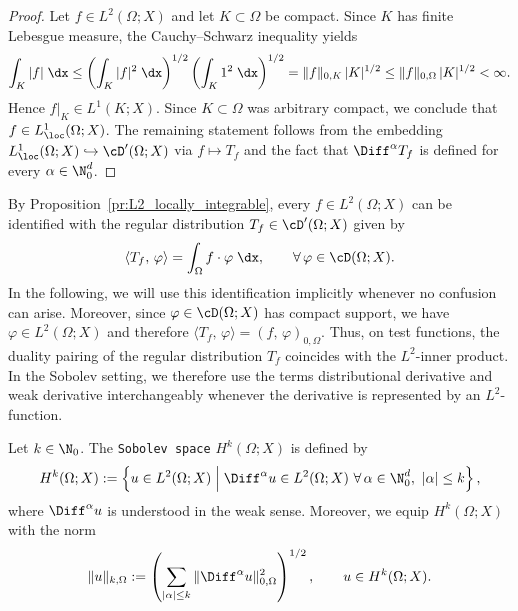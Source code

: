 \begin{proof}
	Let $f\in L^2(\Omega;X)$ and let $K\subset\Omega$ be compact. Since $K$ has finite Lebesgue measure, the Cauchy--Schwarz inequality yields
	\begin{equation*}
		\int_K |f|\;\dx
		\le
		\left(\int_K |f|^2\;\dx\right)^{1/2}\left(\int_K 1^2\;\dx\right)^{1/2}
		=
		\|f\|_{0,K}\,|K|^{1/2}
		\le
		\|f\|_{0,\Omega}\,|K|^{1/2}
		<\infty.
	\end{equation*}
	Hence $f|_K\in L^1(K;X)$. Since $K\subset\Omega$ was arbitrary compact, we conclude that $f\in L^1_\loc(\Omega;X)$. The remaining statement follows from the embedding $L^1_\loc(\Omega;X)\hookrightarrow\cD^\prime(\Omega;X)$ via $f\mapsto T_f$ and the fact that $\Diff^\alpha T_f$ is defined for every $\alpha\in\N_0^d$.
\end{proof}

By Proposition~\ref{pr:L2_locally_integrable}, every $f\in L^2(\Omega;X)$ can be identified with the regular distribution $T_f\in\cD^\prime(\Omega;X)$ given by
\begin{equation*}
	\langle T_f,\,\varphi\rangle = \int_\Omega f\cdot\varphi\;\dx,
	\qquad \forall\,\varphi\in\cD(\Omega;X).
\end{equation*}
In the following, we will use this identification implicitly whenever no confusion can arise. Moreover, since $\varphi\in\cD(\Omega;X)$ has compact support, we have $\varphi\in L^2(\Omega;X)$ and therefore $\langle T_f,\,\varphi\rangle = (f,\,\varphi)_{0,\Omega}$. Thus, on test functions, the duality pairing of the regular distribution $T_f$ coincides with the $L^2$-inner product. In the Sobolev setting, we therefore use the terms distributional derivative and weak derivative interchangeably whenever the derivative is represented by an $L^2$-function.

\begin{definition}
	Let $k\in\N_0$. The {\tt Sobolev space} $H^k(\Omega;X)$ is defined by
	\begin{equation*}
		H^k(\Omega;X)
		:=
		\left\{u\in L^2(\Omega;X)\;\middle|\; \Diff^\alpha u\in L^2(\Omega;X)\ \forall\,\alpha\in\N_0^d,\ |\alpha|\le k\right\},
	\end{equation*}
	where $\Diff^\alpha u$ is understood in the weak sense. Moreover, we equip $H^k(\Omega;X)$ with the norm
	\begin{equation*}
		\|u\|_{k,\Omega}
		:=
		\left(
		\sum_{|\alpha|\le k}\|\Diff^\alpha u\|_{0,\Omega}^2
		\right)^{1/2},
		\qquad u\in H^k(\Omega;X).
	\end{equation*}
\end{definition}

